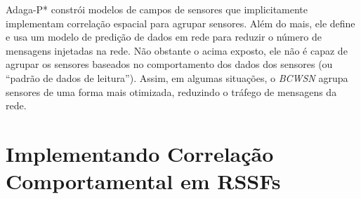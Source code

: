\documentclass{acm_proc_article-sp}
\begin{document}

Adaga-P* \cite{MaiaACR2013} constrói modelos de campos de sensores que
implicitamente implementam correlação espacial para agrupar sensores.
Além do mais, ele define e usa um modelo de predição de dados em rede para
reduzir o número de mensagens injetadas na rede. Não obstante o acima exposto,
ele não é capaz de agrupar os sensores baseados no comportamento dos dados dos
sensores (ou ``padrão de dados de leitura''). Assim, em algumas situações, o
{\it BCWSN} agrupa sensores de uma forma mais otimizada, reduzindo o tráfego de
mensagens da rede.
\vspace*{-.3cm}

\section{Implementando Correlação Comportamental em RSSFs}
\label{implementing-bcwsn}
\end{document}
